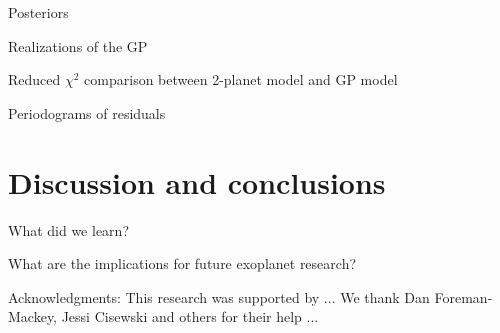 \documentclass{aastex6}
\begin{document}
Posteriors

Realizations of the GP

Reduced $\chi^2$ comparison between 2-planet model and GP model

Periodograms of residuals

\section{Discussion and conclusions}

What did we learn?

What are the implications for future exoplanet research?

Acknowledgments: This research was supported by ... We thank
Dan Foreman-Mackey, Jessi Cisewski and others for their help ...

\begin{thebibliography}{99} 



\end{thebibliography}


\clearpage


\end{document}
